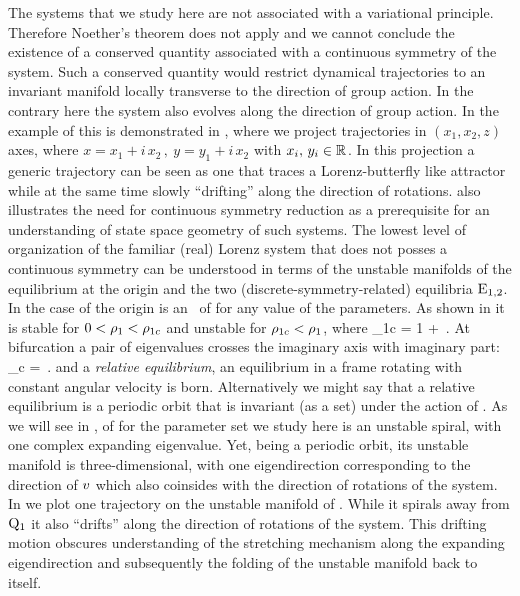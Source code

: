 The systems that we study here are not associated with a variational principle. Therefore
Noether's theorem does not apply and we  cannot conclude the existence of a conserved quantity associated
with a continuous symmetry of the system. Such a conserved quantity would restrict dynamical
trajectories to an invariant manifold locally transverse to the direction of group action.
In the contrary here the system also evolves along the direction of group action. In the example of {\CLe}
this is demonstrated in , where we project trajectories in $(x_1,x_2,z)$ axes, 
where $x=x_1+ i\, x_2\,,\ y=y_1+i\, x_2$ with $x_i,\,y_i\in\mathbb{R}^{}$. In this projection a generic 
trajectory can be seen as one that traces a Lorenz-butterfly like attractor while at the same time slowly
``drifting'' along the direction of rotations.  also illustrates the need for continuous symmetry 
reduction as a prerequisite for an understanding of state space geometry of such systems. 
The lowest level of organization of the familiar (real) Lorenz system that does not posses a continuous symmetry
can be understood in terms of the unstable manifolds of the equilibrium at the origin and the two (discrete-symmetry-related) equilibria $\mathrm{E}_{1,2}$. In the case of {\CLE}  the origin  
is an \eqv\ of  for any
value of the parameters. As shown in  it
is stable for $0<\rho_1<\rho_{1c}$ and unstable for
$\rho_{1c}<\rho_1$, where
\beq
	\rho_{1c} = 1 + \,.
\eeq
At bifurcation a pair of eigenvalues crosses the imaginary axis with imaginary part:
\beq
	\omega_c = \,.
	\label{eq:omegaCLE}
\eeq
and a \emph{relative equilibrium}, an equilibrium in a frame rotating with constant angular velocity
is born. Alternatively we might say that a relative equilibrium is a periodic orbit that is invariant (as a set)
under the action of \Gelement{}.
  As we will see in ,  of {\CLe} for 
the parameter set we study here is an unstable spiral, with one complex expanding eigenvalue. Yet, being a periodic
orbit, its unstable manifold is three-dimensional, with one eigendirection corresponding
to the direction of $v$ which also coinsides with the direction of rotations of the system. 
In  we plot one trajectory on the unstable manifold of . While it spirals away
from $\mathrm{Q}_{1}$ it also ``drifts'' along the direction of rotations of the system. This drifting motion obscures 
understanding of the stretching mechanism along the expanding eigendirection and subsequently the folding of the
unstable manifold back to itself.


